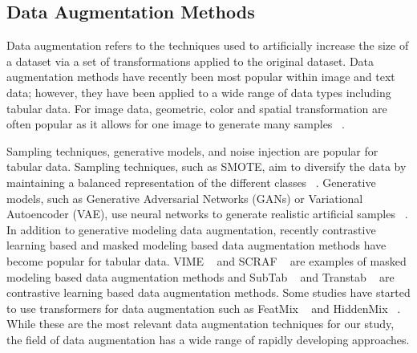 \subsection{Data Augmentation Methods}
Data augmentation refers to the techniques used to artificially increase the size of a dataset via a set of transformations applied to the original dataset. Data augmentation methods have recently been most popular within image and text data; however, they have been applied to a wide range of data types including tabular data. For image data, geometric, color and spatial transformation are often popular as it allows for one image to generate many samples ~\cite{Khoshgoftaar_2019}. 

Sampling techniques, generative models, and noise injection are popular for tabular data. Sampling techniques, such as SMOTE, aim to diversify the data by maintaining a balanced representation of the different classes ~\cite{SMOTE_Kegelmeyer_2002}. Generative models, such as Generative Adversarial Networks (GANs) or Variational Autoencoder (VAE), use neural networks to generate realistic artificial samples ~\cite{Meor_Yahaya_Teo_2023, Sandfort_Yan_2019}. In addition to generative modeling data augmentation, recently contrastive learning based and masked modeling based data augmentation methods have become popular for tabular data. VIME ~\cite{Yoon_2020} and SCRAF ~\cite{Bahri_2021} are examples of masked modeling based data augmentation methods and SubTab ~\cite{Ucar_2021} and Transtab ~\cite{Wang_Sun_2022} are contrastive learning based data augmentation methods. Some studies have started to use transformers for data augmentation such as FeatMix ~\cite{Chen_Yan_Chen_Wu_2023} and HiddenMix ~\cite{Chen_Yan_Chen_Wu_2023}. While these are the most relevant data augmentation techniques for our study, the field of data augmentation has a wide range of rapidly developing approaches. 